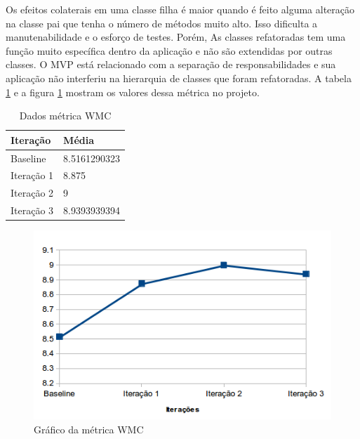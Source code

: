 \documentclass[conference]{IEEEtran}
\begin{document}
Os efeitos colaterais em uma classe filha é maior quando é feito alguma
alteração na classe pai que tenha o número de métodos muito alto\cite{cksuite}.
Isso dificulta a manutenabilidade e o esforço de testes. Porém, As classes
refatoradas tem uma função muito específica dentro da aplicação e não são
extendidas por outras classes. O MVP está relacionado com a separação de
responsabilidades e sua aplicação não interferiu na hierarquia de classes que
foram refatoradas.
A tabela \ref{tab:wmc} e a figura \ref{fig:wmc} mostram os valores dessa
métrica no projeto.


\begin{table}[!h]
	\centering
	\caption{\label{tab:wmc}Dados métrica WMC}
    \begin{tabular}{ | l | l | }
    \hline
    Iteração & Média 			\\ \hline
    Baseline & 8.5161290323   	\\ \hline
    Iteração 1 & 8.875			\\ \hline
	Iteração 2 & 9				\\ \hline
	Iteração 3 & 8.9393939394	\\ \hline
    \end{tabular}
    

\end{table}


\begin{figure}[!htb]
	
	\begin{center}
		\includegraphics[scale=0.75]{img/wmc.png}
	\end{center}
	\caption{\label{fig:wmc} Gráfico da métrica WMC}   
	
\end{figure}


\end{document}
